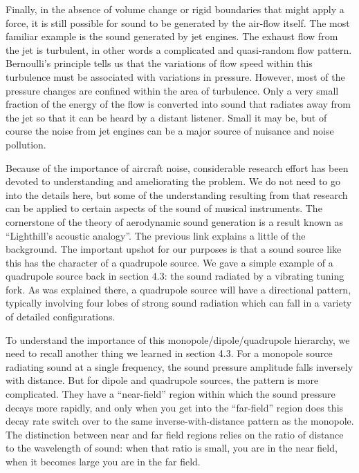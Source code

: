
  Finally, in the absence of volume change or rigid boundaries that might apply 
  a force, it is still possible for sound to be generated by the air-flow 
  itself. The most familiar example is the sound generated by jet engines. The 
  exhaust flow from the jet is turbulent, in other words a complicated and 
  quasi-random flow pattern. Bernoulli’s principle tells us that the variations 
  of flow speed within this turbulence must be associated with variations in 
  pressure. However, most of the pressure changes are confined within the area 
  of turbulence. Only a very small fraction of the energy of the flow is 
  converted into sound that radiates away from the jet so that it can be heard 
  by a distant listener. Small it may be, but of course the noise from jet 
  engines can be a major source of nuisance and noise pollution. 

  Because of the importance of aircraft noise, considerable research effort has 
  been devoted to understanding and ameliorating the problem. We do not need to 
  go into the details here, but some of the understanding resulting from that 
  research can be applied to certain aspects of the sound of musical 
  instruments. The cornerstone of the theory of aerodynamic sound generation is 
  a result known as “Lighthill’s acoustic analogy”. The previous link explains 
  a little of the background. The important upshot for our purposes is that a 
  sound source like this has the character of a quadrupole source. We gave a 
  simple example of a quadrupole source back in section 4.3: the sound radiated 
  by a vibrating tuning fork. As was explained there, a quadrupole source will 
  have a directional pattern, typically involving four lobes of strong sound 
  radiation which can fall in a variety of detailed configurations. 

  To understand the importance of this monopole/dipole/quadrupole hierarchy, we 
  need to recall another thing we learned in section 4.3. For a monopole source 
  radiating sound at a single frequency, the sound pressure amplitude falls 
  inversely with distance. But for dipole and quadrupole sources, the pattern 
  is more complicated. They have a “near-field” region within which the sound 
  pressure decays more rapidly, and only when you get into the “far-field” 
  region does this decay rate switch over to the same inverse-with-distance 
  pattern as the monopole. The distinction between near and far field regions 
  relies on the ratio of distance to the wavelength of sound: when that ratio 
  is small, you are in the near field, when it becomes large you are in the far 
  field. 

